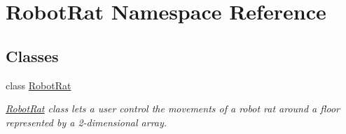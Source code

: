 \hypertarget{namespace_robot_rat}{}\section{Robot\+Rat Namespace Reference}
\label{namespace_robot_rat}
\subsection*{Classes}
\begin{DoxyCompactItemize}
\item 
class \hyperlink{class_robot_rat_1_1_robot_rat}{Robot\+Rat}
\begin{DoxyCompactList}\small\item\em \hyperlink{class_robot_rat_1_1_robot_rat}{Robot\+Rat} class lets a user control the movements of a robot rat around a floor represented by a 2-\/dimensional array. \end{DoxyCompactList}\end{DoxyCompactItemize}
